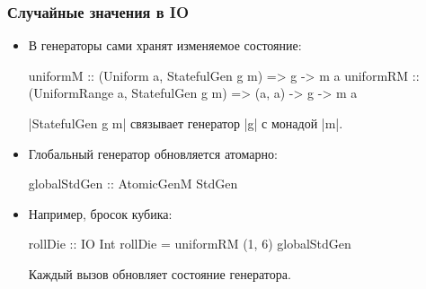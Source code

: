 \documentclass[11pt]{beamer}
\begin{document}
\begin{frame}[fragile]
  \frametitle{Случайные значения в IO}
  \begin{itemize}
    \item В \href{https://hackage.haskell.org/package/random/docs/System-Random-Stateful.html}{} генераторы сами хранят изменяемое состояние:
          \begin{haskellsmall}
            uniformM :: (Uniform a, StatefulGen g m) =>
              g -> m a
            uniformRM :: (UniformRange a, StatefulGen g m) =>
              (a, a) -> g -> m a
          \end{haskellsmall}
          \haskinline|StatefulGen g m| связывает генератор \haskinline|g| с монадой \haskinline|m|.
    \item Глобальный генератор обновляется атомарно:
          \begin{haskellsmall}
            globalStdGen :: AtomicGenM StdGen
          \end{haskellsmall}
    \item Например, бросок кубика:
          \begin{haskellsmall}
            rollDie :: IO Int
            rollDie = uniformRM (1, 6) globalStdGen
          \end{haskellsmall}
          Каждый вызов обновляет состояние генератора.
  \end{itemize}
\end{frame}
\end{document}
